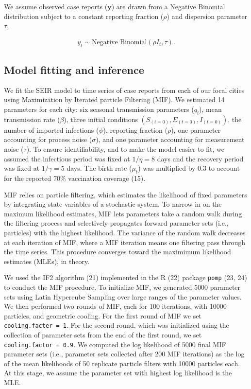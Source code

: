 \documentclass[3p]{elsarticle} %
\begin{document}
We assume observed case reports (\(\textbf{y}\)) are drawn from a
Negative Binomial distribution subject to a constant reporting fraction
(\(\rho\)) and dispersion parameter \(\tau\),

\begin{align}
y_t \sim \text{Negative Binomial} \left( \rho I_t, \tau \right).
\end{align}

\hypertarget{model-fitting-and-inference}{%
\subsection{Model fitting and
inference}\label{model-fitting-and-inference}}

We fit the SEIR model to time series of case reports from each of our
focal cities using Maximization by Iterated particle Filtering (MIF). We
estimated 14 parameters for each city: six seasonal transmission
parameters (\(q_i\)), mean transmission rate (\(\beta\)), three initial
conditions \(\left(S_{(t=0)},E_{(t=0)},I_{(t=0)}\right)\), the number of
imported infections (\(\psi\)), reporting fraction (\(\rho\)), one
parameter accounting for process noise (\(\sigma\)), and one parameter
accounting for measurement noise (\(\tau\)). To ensure identifiability,
and to make the model easier to fit, we assumed the infectious period
was fixed at \(1/\eta = 8\) days and the recovery period was fixed at
\(1/\gamma = 5\) days. The birth rate (\(\mu_t\)) was multiplied by 0.3
to account for the reported 70\% vaccination coverage (15).

MIF relies on particle filtering, which estimates the likelihood of
fixed parameters by integrating state variables of a stochastic system.
To narrow in on the maximum likelihood estimates, MIF lets parameters
take a random walk during the filtering process and selectively
propagates forward parameter sets (i.e., particles) with the highest
likelihood. The variance of the random walk decreases at each iteration
of MIF, where a MIF iteration means one filtering pass through the time
series. This procedure converges toward the maximimum likelihood
estimates (MLEs), in theory.

We used the IF2 algorithm (21) implemented in the R (22) package
\texttt{pomp} (23, 24) to conduct the MIF procedure. To initialize MIF,
we generated 5000 parameter sets using Latin Hypercube Sampling over
large ranges of the parameter values. We then performed two rounds of
MIF, each for 100 iterations, with 10000 particles, and geometric
cooling. For the first round of MIF we set
\texttt{cooling.facter\ =\ 1}. For the second round, which was
initialized using the collection of parameter sets from the end of the
first round, we set \texttt{cooling.factor\ =\ 0.9}. We computed the log
likelihood of 5000 final MIF parameter sets (i.e., parameter sets
collected after 200 MIF iterations) as the log of the mean likelihoods
of 50 replicate particle filters with 10000 particles each. At this
stage, we assume the parameter set with highest log likelihood is the
MLE.
\end{document}
